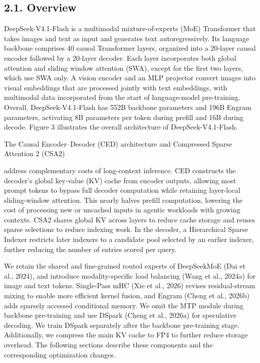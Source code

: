 \documentclass[
  10
]{article}
\begin{document}
\subsection{2.1. Overview}\label{overview}

DeepSeek-V4.1-Flash is a multimodal mixture-of-experts (MoE) Transformer
that takes images and text as input and generates text autoregressively.
Its language backbone comprises 40 causal Transformer layers, organized
into a 20-layer causal encoder followed by a 20-layer decoder. Each
layer incorporates both global attention and sliding window attention
(SWA), except for the first two layers, which use SWA only. A vision
encoder and an MLP projector convert images into visual embeddings that
are processed jointly with text embeddings, with multimodal data
incorporated from the start of language-model pre-training. Overall,
DeepSeek-V4.1-Flash has 552B backbone parameters and 196B Engram
parameters, activating 8B parameters per token during prefill and 16B
during decode. Figure 3 illustrates the overall architecture of
DeepSeek-V4.1-Flash.

The Causal Encoder--Decoder (CED) architecture and Compressed Sparse
Attention 2 (CSA2)

address complementary costs of long-context inference. CED constructs
the decoder's global key-value (KV) cache from encoder outputs, allowing
most prompt tokens to bypass full decoder computation while retaining
layer-local sliding-window attention. This nearly halves prefill
computation, lowering the cost of processing new or uncached inputs in
agentic workloads with growing contexts. CSA2 shares global KV across
layers to reduce cache storage and reuses sparse selections to reduce
indexing work. In the decoder, a Hierarchical Sparse Indexer restricts
later indexers to a candidate pool selected by an earlier indexer,
further reducing the number of entries scored per query.

We retain the shared and fine-grained routed experts of DeepSeekMoE (Dai
et al., 2024), and introduce modality-specific load balancing (Wang et
al., 2024a) for image and text tokens. Single-Pass mHC (Xie et al.,
2026) revises residual-stream mixing to enable more efficient kernel
fusion, and Engram (Cheng et al., 2026b) adds sparsely accessed
conditional memory. We omit the MTP module during backbone pre-training
and use DSpark (Cheng et al., 2026a) for speculative decoding. We train
DSpark separately after the backbone pre-training stage. Additionally,
we compress the main KV cache to FP4 to further reduce storage overhead.
The following sections describe these components and the corresponding
optimization changes.
\end{document}
